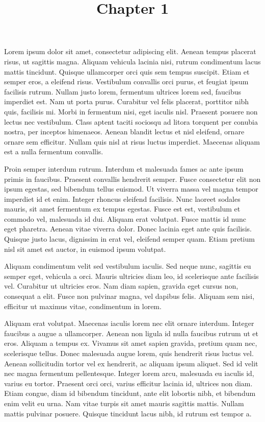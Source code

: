 \documentclass{article}
\begin{document}
\title{Chapter 1}

\maketitle


Lorem ipsum dolor sit amet, consectetur adipiscing elit. Aenean tempus placerat risus, ut sagittis magna. Aliquam vehicula lacinia nisi, rutrum condimentum lacus mattis tincidunt. Quisque ullamcorper orci quis sem tempus suscipit. Etiam et semper eros, a eleifend risus. Vestibulum convallis orci purus, et feugiat ipsum facilisis rutrum. Nullam justo lorem, fermentum ultrices lorem sed, faucibus imperdiet est. Nam ut porta purus. Curabitur vel felis placerat, porttitor nibh quis, facilisis mi. Morbi in fermentum nisi, eget iaculis nisl. Praesent posuere non lectus nec vestibulum. Class aptent taciti sociosqu ad litora torquent per conubia nostra, per inceptos himenaeos. Aenean blandit lectus et nisl eleifend, ornare ornare sem efficitur. Nullam quis nisl at risus luctus imperdiet. Maecenas aliquam est a nulla fermentum convallis.


Proin semper interdum rutrum. Interdum et malesuada fames ac ante ipsum primis in faucibus. Praesent convallis hendrerit semper. Fusce consectetur elit non ipsum egestas, sed bibendum tellus euismod. Ut viverra massa vel magna tempor imperdiet id et enim. Integer rhoncus eleifend facilisis. Nunc laoreet sodales mauris, sit amet fermentum ex tempus egestas. Fusce est est, vestibulum et commodo vel, malesuada id dui. Aliquam erat volutpat. Fusce mattis id nunc eget pharetra. Aenean vitae viverra dolor. Donec lacinia eget ante quis facilisis. Quisque justo lacus, dignissim in erat vel, eleifend semper quam. Etiam pretium nisl sit amet est auctor, in euismod ipsum volutpat.


Aliquam condimentum velit sed vestibulum iaculis. Sed neque nunc, sagittis eu semper eget, vehicula a orci. Mauris ultricies diam leo, id scelerisque ante facilisis vel. Curabitur ut ultricies eros. Nam diam sapien, gravida eget cursus non, consequat a elit. Fusce non pulvinar magna, vel dapibus felis. Aliquam sem nisi, efficitur ut maximus vitae, condimentum in lorem.


Aliquam erat volutpat. Maecenas iaculis lorem nec elit ornare interdum. Integer faucibus a augue a ullamcorper. Aenean non ligula id nulla faucibus rutrum ut et eros. Aliquam a tempus ex. Vivamus sit amet sapien gravida, pretium quam nec, scelerisque tellus. Donec malesuada augue lorem, quis hendrerit risus luctus vel. Aenean sollicitudin tortor vel ex hendrerit, ac aliquam ipsum aliquet. Sed id velit nec magna fermentum pellentesque. Integer lorem arcu, malesuada eu iaculis id, varius eu tortor. Praesent orci orci, varius efficitur lacinia id, ultrices non diam. Etiam congue, diam id bibendum tincidunt, ante elit lobortis nibh, et bibendum enim velit eu urna. Nam vitae turpis sit amet mauris sagittis mattis. Nullam mattis pulvinar posuere. Quisque tincidunt lacus nibh, id rutrum est tempor a.
\end{document}
